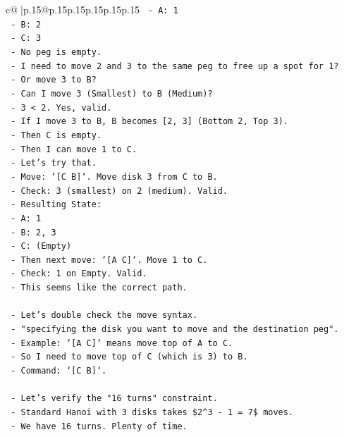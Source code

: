 \documentclass{article}
\begin{document}
{\begin{supertabular}{c@{$\;$}|p{.15\linewidth}@{}p{.15\linewidth}p{.15\linewidth}p{.15\linewidth}p{.15\linewidth}p{.15\linewidth}}
{{{\texttt{    {-} A: 1} \\
\texttt{    {-} B: 2} \\
\texttt{    {-} C: 3} \\
\texttt{  {-} No peg is empty.} \\
\texttt{  {-} I need to move 2 and 3 to the same peg to free up a spot for 1?} \\
\texttt{  {-} Or move 3 to B?} \\
\texttt{  {-} Can I move 3 (Smallest) to B (Medium)?} \\
\texttt{  {-} 3 < 2. Yes, valid.} \\
\texttt{  {-} If I move 3 to B, B becomes {[}2, 3{]} (Bottom 2, Top 3).} \\
\texttt{  {-} Then C is empty.} \\
\texttt{  {-} Then I can move 1 to C.} \\
\texttt{  {-} Let's try that.} \\
\texttt{  {-} Move: `{[}C B{]}`. Move disk 3 from C to B.} \\
\texttt{  {-} Check: 3 (smallest) on 2 (medium). Valid.} \\
\texttt{  {-} Resulting State:} \\
\texttt{    {-} A: 1} \\
\texttt{    {-} B: 2, 3} \\
\texttt{    {-} C: (Empty)} \\
\texttt{  {-} Then next move: `{[}A C{]}`. Move 1 to C.} \\
\texttt{  {-} Check: 1 on Empty. Valid.} \\
\texttt{  {-} This seems like the correct path.} \\
\\ 
\texttt{  {-} Let's double check the move syntax.} \\
\texttt{  {-} "specifying the disk you want to move and the destination peg".} \\
\texttt{  {-} Example: `{[}A C{]}` means move top of A to C.} \\
\texttt{  {-} So I need to move top of C (which is 3) to B.} \\
\texttt{  {-} Command: `{[}C B{]}`.} \\
\\ 
\texttt{  {-} Let's verify the "16 turns" constraint.} \\
\texttt{  {-} Standard Hanoi with 3 disks takes \$2\^{}3 {-} 1 = 7\$ moves.} \\
\texttt{  {-} We have 16 turns. Plenty of time.} \\
}}}
\end{supertabular}}
\end{document}
